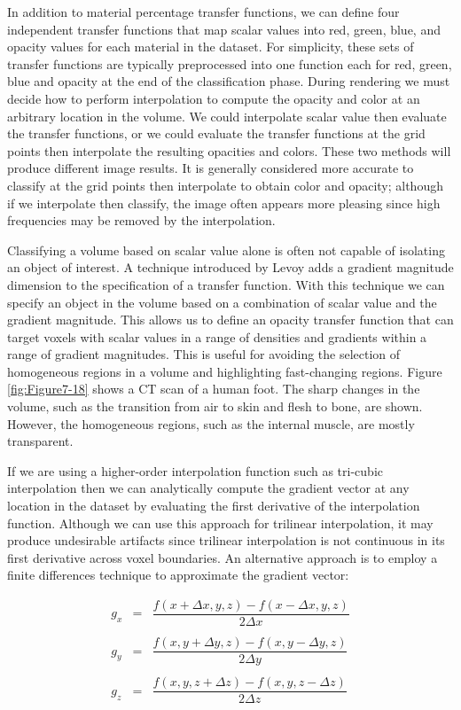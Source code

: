 In addition to material percentage transfer functions, we can define four independent transfer functions that map scalar values into red, green, blue, and opacity values for each material in the dataset. For simplicity, these sets of transfer functions are typically preprocessed into one function each for red, green, blue and opacity at the end of the classification phase. During rendering we must decide how to perform interpolation to compute the opacity and color at an arbitrary location in the volume. We could interpolate scalar value then evaluate the transfer functions, or we could evaluate the transfer functions at the grid points then interpolate the resulting opacities and colors. These two methods will produce different image results. It is generally considered more accurate to classify at the grid points then interpolate to obtain color and opacity; although if we interpolate then classify, the image often appears more pleasing since high frequencies may be removed by the interpolation.

Classifying a volume based on scalar value alone is often not capable of isolating an object of interest. A technique introduced by Levoy \cite{Levoy88} adds a gradient magnitude dimension to the specification of a transfer function. With this technique we can specify an object in the volume based on a combination of scalar value and the gradient magnitude. This allows us to define an opacity transfer function that can target voxels with scalar values in a range of densities and gradients within a range of gradient magnitudes. This is useful for avoiding the selection of homogeneous regions in a volume and highlighting fast-changing regions. Figure \ref{fig:Figure7-18} shows a CT scan of a human foot. The sharp changes in the volume, such as the transition from air to skin and flesh to bone, are shown. However, the homogeneous regions, such as the internal muscle, are mostly transparent.

If we are using a higher-order interpolation function such as tri-cubic interpolation then we can analytically compute the gradient vector at any location in the dataset by evaluating the first derivative of the interpolation function. Although we can use this approach for trilinear interpolation, it may produce undesirable artifacts since trilinear interpolation is not continuous in its first derivative across voxel boundaries. An alternative approach is to employ a finite differences technique to approximate the gradient vector:

\begin{equation}\label{eq:7.3}
\begin{array}{lll}
g_x &=& \dfrac{f(x + \Delta x, y, z) - f(x - \Delta x, y, z)}{2 \Delta x} \\ \\
g_y &=& \dfrac{f(x, y + \Delta y, z) - f(x, y - \Delta y, z)}{2 \Delta y} \\ \\
g_z &=& \dfrac{f(x, y, z + \Delta z) - f(x, y, z - \Delta z)}{2 \Delta z}
\end{array}
\end{equation}

